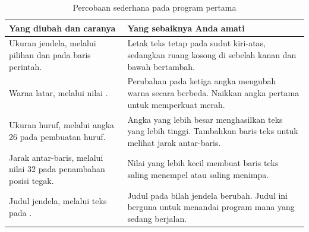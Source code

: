 \begin{table}[htbp]
\centering
\caption{Percobaan sederhana pada program pertama}
\label{tab:percobaan-ch03}
{\setlength{\tabcolsep}{4pt}\footnotesize%
\begin{tabularx}{\textwidth}{@{}L{6.0cm} Y@{}}
\toprule
\headrow \textbf{Yang diubah dan caranya} & \textbf{Yang sebaiknya Anda amati} \\
\midrule
Ukuran jendela, melalui pilihan  dan  pada baris
perintah. &
Letak teks tetap pada sudut kiri-atas, sedangkan ruang kosong di sebelah kanan
dan bawah bertambah. \\
\addlinespace
Warna latar, melalui nilai . &
Perubahan pada ketiga angka mengubah warna secara berbeda. Naikkan angka
pertama untuk memperkuat merah. \\
\addlinespace
Ukuran huruf, melalui angka 26 pada pembuatan huruf. &
Angka yang lebih besar menghasilkan teks yang lebih tinggi. Tambahkan baris
teks untuk melihat jarak antar-baris. \\
\addlinespace
Jarak antar-baris, melalui nilai 32 pada penambahan posisi tegak. &
Nilai yang lebih kecil membuat baris teks saling menempel atau saling
menimpa. \\
\addlinespace
Judul jendela, melalui teks pada . &
Judul pada bilah jendela berubah. Judul ini berguna untuk menandai program
mana yang sedang berjalan. \\
\bottomrule
\end{tabularx}}
\end{table}
